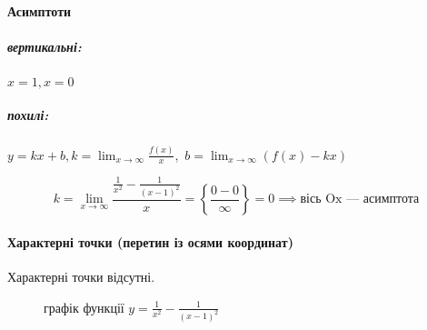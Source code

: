 \documentclass[../rgr1.tex]{subfiles}
\begin{document}
\paragraph{Асимптоти}

\subparagraph{вертикальні:}
$x = 1, x = 0$

\subparagraph{похилі:}
$y = kx + b, k = \lim_{x\to\infty}\frac{f(x)}{x},$
$ b = \lim_{x\to\infty} ( f(x) - kx )$

\begin{equation}
	k = \lim_{x\to\infty} \frac{ \frac{1}{x^2} - \frac{1}{(x-1)^2} }{x} =
	\left\{
		\frac{0-0}{\infty}
	\right\} = 0 \implies \text{вісь Ox --- асимптота}
\end{equation}

\paragraph{Характерні точки (перетин із осями координат)}
Характерні точки відсутні.

\begin{figure}[h]
	\centering
	\caption{графік функції
	$y = \frac{1}{x^2} - \frac{1}{(x-1)^2}$
}
\end{figure}

\end{document}
